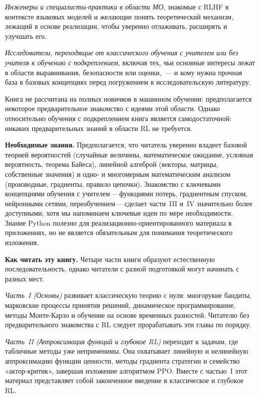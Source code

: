 \emph{Инженеры и специалисты-практики в области МО}, знакомые с RLHF в контексте языковых моделей и желающие понять теоретический механизм, лежащий в основе реализации, чтобы уверенно отлаживать, расширять и улучшать его.

\emph{Исследователи, переходящие от классического обучения с учителем или без учителя к обучению с подкреплением}, включая тех, чьи основные интересы лежат в области выравнивания, безопасности или оценки,~--- и кому нужна прочная база в базовых концепциях перед погружением в исследовательскую литературу.

Книга не рассчитана на полных новичков в машинном обучении: предполагается некоторое предварительное знакомство с идеями этой области. Однако относительно обучения с подкреплением книга является самодостаточной: никаких предварительных знаний в области RL не требуется.

\medskip

\textbf{Необходимые знания.}\quad
Предполагается, что читатель уверенно владеет базовой теорией вероятностей (случайные величины, математическое ожидание, условная вероятность, теорема Байеса), линейной алгеброй (векторы, матрицы, собственные значения) и одно- и многомерным математическим анализом (производные, градиенты, правило цепочки). Знакомство с ключевыми концепциями обучения с учителем\,---\,функциями потерь, градиентным спуском, нейронными сетями, переобучением\,---\,сделает части~III и~IV значительно более доступными, хотя мы напоминаем ключевые идеи по мере необходимости. Знание Python полезно для реализационно-ориентированного материала в приложениях, но не является обязательным для понимания теоретического изложения.

\medskip

\textbf{Как читать эту книгу.}\quad
Четыре части книги образуют естественную последовательность, однако читатели с разной подготовкой могут начинать с разных мест.

\emph{Часть~I (Основы)} развивает классическую теорию с нуля: многорукие бандиты, марковские процессы принятия решений, динамическое программирование, методы Монте-Карло и обучение на основе временных разностей. Читателю без предварительного знакомства с RL следует прорабатывать эти главы по порядку.

\emph{Часть~II (Аппроксимация функций и глубокое RL)} переходит к задачам, где табличные методы уже неприменимы. Она охватывает линейную и нелинейную аппроксимацию функции ценности, методы градиента стратегии и семейство «актор-критик», завершая изложение алгоритмом PPO. Вместе с частью~I этот материал представляет собой законченное введение в классическое и глубокое RL.

